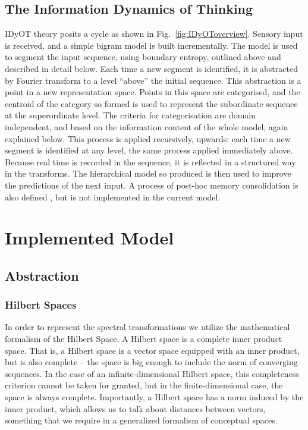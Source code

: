 \documentclass[runningheads]{llncs}
\begin{document}
\subsection{The Information Dynamics of Thinking}

IDyOT theory posits a cycle as shown in Fig.~\ref{fig:IDyOToverview}. Sensory input is received, and a simple bigram model is built incrementally. The model is used to segment the input sequence, using boundary entropy, outlined above and described in detail below. Each time a new segment is identified, it is abstracted by Fourier transform to a level ``above'' the initial sequence. This abstraction is a point in a new representation space. Points in this space are categorised, and the centroid of the category so formed is used to represent the subordinate sequence at the superordinate level. The criteria for categorisation are domain independent, and based on the information content of the whole model, again explained below. This process is applied recursively, upwards: each time a new segment is identified at any level, the same process applied immediately above. Because real time is recorded in the sequence, it is reflected in a structured way in the transforms. The hierarchical model so produced is then used to improve the predictions of the next input. A process of post-hoc memory consolidation is also defined \citep{Wiggins18,WigginsSanjekdar19}, but is not implemented in the current model.


\section{Implemented Model}


\subsection{Abstraction}

\subsubsection{Hilbert Spaces}
In order to represent the spectral transformations we utilize the mathematical formalism of the Hilbert Space.  A Hilbert space is a complete inner product space.  That is, a Hilbert space is a vector space equipped with an inner product, but is also complete -- the space is big enough to include the norm of converging sequences.  In the case of an infinite-dimensional Hilbert space, this completeness criterion cannot be taken for granted, but in the finite-dimensional case, the space is always complete.  Importantly, a Hilbert space has a norm induced by the inner product, which allows us to talk about distances between vectors, something that we require in a generalized formalism of conceptual spaces.
\end{document}
